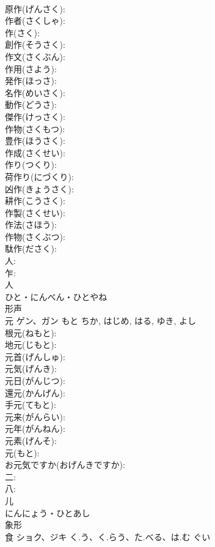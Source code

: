 \documentclass[8pt]{extreport}
\begin{document}
\begin{CJK}{UTF8}{min}
\\	原作(げんさく): 
\\	作者(さくしゃ): 
\\	作(さく): 
\\	創作(そうさく): 
\\	作文(さくぶん): 
\\	作用(さよう): 
\\	発作(ほっさ): 
\\	名作(めいさく): 
\\	動作(どうさ): 
\\	傑作(けっさく): 
\\	作物(さくもつ): 
\\	豊作(ほうさく): 
\\	作成(さくせい): 
\\	作り(つくり): 
\\	荷作り(にづくり): 
\\	凶作(きょうさく): 
\\	耕作(こうさく): 
\\	作製(さくせい): 
\\	作法(さほう): 
\\	作物(さくぶつ): 
\\	駄作(ださく): 
\\	人: 
\\	乍: 
\\	人	
\\	ひと・にんべん・ひとやね	
\\	形声 
\\	元	ゲン、ガン	もと	ちか, はじめ, はる, ゆき, よし	
\\	根元(ねもと): 
\\	地元(じもと): 
\\	元首(げんしゅ): 
\\	元気(げんき): 
\\	元日(がんじつ): 
\\	還元(かんげん): 
\\	手元(てもと): 
\\	元来(がんらい): 
\\	元年(がんねん): 
\\	元素(げんそ): 
\\	元(もと): 
\\	お元気ですか(おげんきですか): 
\\	二: 
\\	八: 
\\	儿	
\\	にんにょう・ひとあし	
\\	象形 
\\	食	ショク、ジキ	く.う、く.らう、た.べる、は.む	ぐい	

\end{CJK}
\end{document}
